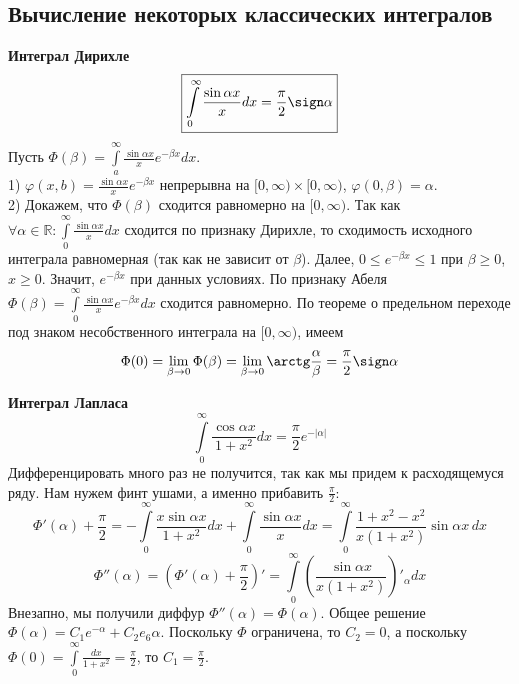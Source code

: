 \subsection{Вычисление некоторых классических интегралов}

\textbf{Интеграл Дирихле}
$$\boxed{
\int\limits_{0}^{\infty}\frac{\sin\alpha x}{x}dx=\frac{\pi}{2}\sign\alpha}$$
Пусть $\Phi(\beta)=\int\limits_{a}^{\infty}\frac{\sin\alpha x}{x}e^{
-\beta x}dx$.\\
1) $\varphi(x,b)=\frac{\sin\alpha x}{x}e^{-\beta x}$ непрерывна на 
$[0,\infty)\times [0,\infty)$, $\varphi(0,\beta)=\alpha$. \\
2) Докажем, что $\Phi(\beta)$ сходится равномерно на $[0,\infty)$.
Так как $\forall \alpha\in \mathbb{R}: \int\limits_{0}^{\infty}
\frac{\sin\alpha x}{x}dx$ сходится по признаку Дирихле, то сходимость
исходного интеграла равномерная (так как не зависит от $\beta$). 
Далее, $0\leqslant e^{-\beta x}\leqslant 1$ при $\beta\geqslant 0$,
$x\geqslant 0$. Значит, $e^{-\beta x}$ при данных условиях.
По признаку Абеля $\Phi(\beta)=\int\limits_{0}^{\infty}\frac{\sin\alpha x}{
x}e^{-\beta x}dx$ сходится равномерно. По теореме о предельном переходе под
знаком несобственного интеграла на $[0,\infty)$, имеем
$$\Phi(0)=\lim\limits_{\beta \to 0}\Phi(\beta)=\lim\limits_{\beta \to 0}
\arctg \frac{\alpha}{\beta}=\frac{\pi}{2}\sign\alpha$$

\textbf{Интеграл Лапласа}
$$\boxed{
    \int\limits_{0}^{\infty} \frac{\cos\alpha x}{1+x^2}dx=\frac{\pi}{2}
    e^{-|\alpha|}
}$$
Дифференцировать много раз не получится, так как мы придем к расходящемуся 
ряду. Нам нужем финт ушами, а именно прибавить $\frac{\pi}{2}$:
$$\Phi'(\alpha)+\frac{\pi}{2}=-\int\limits_{0}^{\infty} \frac{x\sin\alpha x}{
1+x^2}dx+\int\limits_{0}^{\infty} \frac{\sin\alpha x}{x}dx=
\int\limits_{0}^{\infty}\frac{1+x^2-x^2}{x(1+x^2)}\sin\alpha x\,dx$$
$$\Phi''(\alpha)=\left(\Phi'(\alpha)+\frac{\pi}{2}\right)'
=\int\limits_{0}^{\infty}
\left( \frac{\sin\alpha x}{x(1+x^2)}\right)'_\alpha dx$$
Внезапно, мы получили диффур $\Phi''(\alpha)=\Phi(\alpha)$. Общее решение
$\Phi(\alpha)=C_1e^{-\alpha}+C_2e_6{\alpha}$. Поскольку $\Phi$ ограничена,
то  $C_2=0$, а поскольку $\Phi(0)=\int\limits_{0}^{\infty}\frac{dx}{1+x^2}=
\frac{\pi}{2}$, то $C_1=\frac{\pi}{2}$. 





